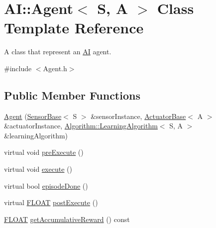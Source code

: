 \hypertarget{classAI_1_1Agent}{\section{A\-I\-:\-:Agent$<$ S, A $>$ Class Template Reference}
\label{classAI_1_1Agent}
}


A class that represent an \hyperlink{namespaceAI}{A\-I} agent.  




{\ttfamily \#include $<$Agent.\-h$>$}

\subsection*{Public Member Functions}
\begin{DoxyCompactItemize}
\item 
\hyperlink{classAI_1_1Agent_aee53a91a44c5afa9a7af9113ba9edf2e}{Agent} (\hyperlink{classAI_1_1SensorBase}{Sensor\-Base}$<$ S $>$ \&sensor\-Instance, \hyperlink{classAI_1_1ActuatorBase}{Actuator\-Base}$<$ A $>$ \&actuator\-Instance, \hyperlink{classAI_1_1Algorithm_1_1LearningAlgorithm}{Algorithm\-::\-Learning\-Algorithm}$<$ S, A $>$ \&learning\-Algorithm)
\item 
virtual void \hyperlink{classAI_1_1Agent_a938963e5cbbd862402a4b815b9327093}{pre\-Execute} ()
\item 
virtual void \hyperlink{classAI_1_1Agent_a4c1fa5a86e2baa6510fb1448baff8b83}{execute} ()
\item 
virtual bool \hyperlink{classAI_1_1Agent_a65523b33cc9ca3da9200550ecd0a90e0}{episode\-Done} ()
\item 
virtual \hyperlink{namespaceAI_a41b74884a20833db653dded3918e05c3}{F\-L\-O\-A\-T} \hyperlink{classAI_1_1Agent_ae93d7ac5e75646b0965f18fd9c6a1737}{post\-Execute} ()
\item 
\hyperlink{namespaceAI_a41b74884a20833db653dded3918e05c3}{F\-L\-O\-A\-T} \hyperlink{classAI_1_1Agent_a86266ab330105f0eabda91d9706133de}{get\-Accumulative\-Reward} () const 
\end{DoxyCompactItemize}
